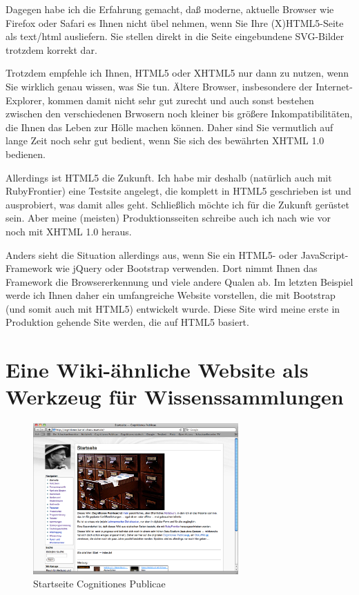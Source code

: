 \documentclass[11pt]{report}
\begin{document}
Dagegen habe ich die Erfahrung gemacht, daß moderne, aktuelle Browser
wie Firefox oder Safari es Ihnen nicht übel nehmen, wenn Sie Ihre
(X)HTML5-Seite als text/html ausliefern. Sie stellen direkt in die
Seite eingebundene SVG-Bilder trotzdem korrekt dar.


Trotzdem empfehle ich Ihnen, HTML5 oder XHTML5 nur dann zu nutzen,
wenn Sie wirklich genau wissen, was Sie tun. Ältere Browser,
insbesondere der Internet-Explorer, kommen damit nicht sehr gut
zurecht und auch sonst bestehen zwischen den verschiedenen Brwosern
noch kleiner bis größere Inkompatibilitäten, die Ihnen das Leben zur
Hölle machen können. Daher sind Sie vermutlich auf lange Zeit noch
sehr gut bedient, wenn Sie sich des bewährten XHTML 1.0 bedienen.


Allerdings ist HTML5 die Zukunft. Ich habe mir deshalb (natürlich auch
mit RubyFrontier) eine Testsite angelegt, die komplett in HTML5
geschrieben ist und ausprobiert, was damit alles geht. Schließlich
möchte ich für die Zukunft gerüstet sein. Aber meine (meisten)
Produktionsseiten schreibe auch ich nach wie vor noch mit XHTML 1.0
heraus.


Anders sieht die Situation allerdings aus, wenn Sie ein HTML5- oder
JavaScript-Framework wie jQuery oder Bootstrap verwenden. Dort nimmt
Ihnen das Framework die Browsererkennung und viele andere Qualen
ab. Im letzten Beispiel werde ich Ihnen daher ein umfangreiche Website
vorstellen, die mit Bootstrap (und somit auch mit HTML5) entwickelt
wurde. Diese Site wird meine erste in Produktion gehende Site werden,
die auf HTML5 basiert.
\chapter{Eine Wiki-ähnliche Website als Werkzeug für Wissenssammlungen}
\label{sec-2-10}


\begin{figure}[h!]
\centering
\includegraphics[width=0.7\textwidth]{./images/cognitiones-start.png}
\caption{\label{cognitiones-start}Startseite Cognitiones Publicae}
\end{figure}
\end{document}
